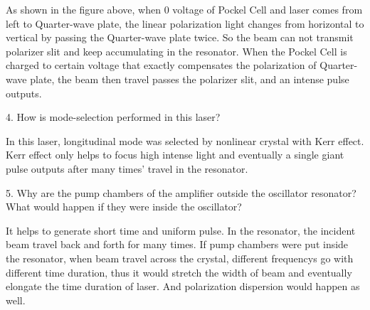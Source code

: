 \documentclass{article}
\begin{document}
As shown in the figure above, when 0 voltage of Pockel Cell and laser comes from left to Quarter-wave plate, the linear polarization light changes from horizontal to vertical by passing the Quarter-wave plate twice. So the beam can not transmit polarizer slit and keep accumulating in the resonator. When the Pockel Cell is charged to certain voltage that exactly compensates the polarization of Quarter-wave plate, the beam then travel passes the polarizer slit, and an intense pulse outputs. \\
\par 
4. How is mode-selection performed in this laser?\par 
In this laser, longitudinal mode was selected by nonlinear crystal with Kerr effect. Kerr effect only helps to focus high intense light and eventually a single giant pulse outputs after many times' travel in the resonator. \\
\par 
5. Why are the pump chambers of the amplifier outside the oscillator resonator? What would happen if they were inside the oscillator?\par 
It helps to generate short time and uniform pulse. In the resonator, the incident beam travel back and forth for many times. If pump chambers were put inside the resonator, when beam travel across the crystal, different frequencys go with different time duration, thus it would stretch the width of beam and eventually elongate the time duration of laser. And polarization dispersion would happen as well.\\
\par 
\end{document}
